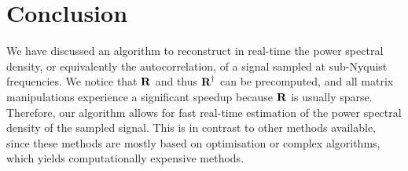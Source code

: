 \documentclass[a4paper, openany, oneside]{memoir}
\begin{document}
\section{Conclusion}
We have discussed an algorithm to reconstruct in real-time the power spectral density, or equivalently the autocorrelation, of a signal sampled at sub-Nyquist frequencies. We notice that $\boldsymbol{\mathbf{R}}$ and thus $\boldsymbol{\mathbf{R}}^\dagger$ can be precomputed, and all matrix manipulations experience a significant speedup because $\boldsymbol{\mathbf{R}}$ is usually sparse. Therefore, our algorithm allows for fast real-time estimation of the power spectral density of the sampled signal. This is in contrast to other methods available, since these methods are mostly based on optimisation or complex algorithms, which yields computationally expensive methods.
\end{document}
